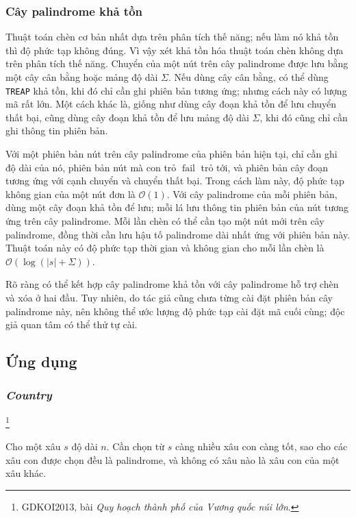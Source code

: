 \documentclass[11pt]{article}
\newcommand{\Oh}{\mathcal{O}}
\begin{document}
\subsubsection{Cây palindrome khả tồn}

Thuật toán chèn cơ bản nhất dựa trên phân tích thế năng; nếu làm nó khả tồn
thì độ phức tạp không đúng. Vì vậy xét khả tồn hóa thuật toán chèn không dựa
trên phân tích thế năng. Chuyển của một nút trên cây palindrome được lưu bằng
một cây cân bằng hoặc mảng độ dài \(\Sigma\). Nếu dùng cây cân bằng, có thể
dùng \texttt{TREAP} khả tồn, khi đó chỉ cần ghi phiên bản tương ứng; nhưng
cách này có lượng mã rất lớn. Một cách khác là, giống như dùng cây đoạn khả
tồn để lưu chuyển thất bại, cũng dùng cây đoạn khả tồn để lưu mảng độ dài
\(\Sigma\), khi đó cũng chỉ cần ghi thông tin phiên bản.

Với một phiên bản nút trên cây palindrome của phiên bản hiện tại, chỉ cần ghi
độ dài của nó, phiên bản nút mà con trỏ \(\operatorname{fail}\) trỏ tới, và
phiên bản cây đoạn tương ứng với cạnh chuyển và chuyển thất bại. Trong cách
làm này, độ phức tạp không gian của một nút đơn là \(\Oh(1)\). Với cây
palindrome của mỗi phiên bản, dùng một cây đoạn khả tồn để lưu; mỗi lá lưu
thông tin phiên bản của nút tương ứng trên cây palindrome. Mỗi lần chèn có thể
cần tạo một nút mới trên cây palindrome, đồng thời cần lưu hậu tố palindrome
dài nhất ứng với phiên bản này. Thuật toán này có độ phức tạp thời gian và
không gian cho mỗi lần chèn là \(\Oh(\log(|s|+\Sigma))\).

Rõ ràng có thể kết hợp cây palindrome khả tồn với cây palindrome hỗ trợ chèn
và xóa ở hai đầu. Tuy nhiên, do tác giả cũng chưa từng cài đặt phiên bản cây
palindrome này, nên không thể ước lượng độ phức tạp cài đặt mã cuối cùng; độc
giả quan tâm có thể thử tự cài.

\subsection{Ứng dụng}

\subsubsection{\emph{Country}}
\footnote{GDKOI2013, bài \emph{Quy hoạch thành phố của Vương quốc núi lớn}.}

Cho một xâu \(s\) độ dài \(n\). Cần chọn từ \(s\) càng nhiều xâu con càng tốt,
sao cho các xâu con được chọn đều là palindrome, và không có xâu nào là xâu
con của một xâu khác.
\end{document}
